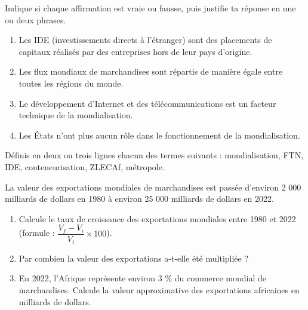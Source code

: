 \documentclass[11pt]{article}
\newcommand{\cle}[1]{{\popxbold\color{popdark}#1}}
\newcounter{popsec}
\newcounter{popsub}
\newcommand{\courssub}[1]{%
  \stepcounter{popsub}%
  \par\vspace{9pt}\noindent{\popxbold\fontsize{11.5}{13}\selectfont\color{popink}{\color{poporange}\thepopsec.\thepopsub}\hspace{6pt}#1}\par\nopagebreak\vspace{4pt}
}
\begin{document}
\begin{exercice}
Indique si chaque affirmation est vraie ou fausse, puis justifie ta réponse en une ou deux phrases.
\begin{enumerate}
\item Les IDE (investissements directs à l'étranger) sont des placements de capitaux réalisés par des entreprises hors de leur pays d'origine.
\item Les flux mondiaux de marchandises sont répartis de manière égale entre toutes les régions du monde.
\item Le développement d'Internet et des télécommunications est un facteur technique de la mondialisation.
\item Les États n'ont plus aucun rôle dans le fonctionnement de la mondialisation.
\end{enumerate}
\end{exercice}

\begin{exercice}[Définitions]
Définis en deux ou trois lignes chacun des termes suivants : \cle{mondialisation}, \cle{FTN}, \cle{IDE}, \cle{conteneurisation}, \cle{ZLECAf}, \cle{métropole}.
\end{exercice}

\begin{exercice}
La valeur des exportations mondiales de marchandises est passée d'environ 2 000 milliards de dollars en 1980 à environ 25 000 milliards de dollars en 2022.
\begin{enumerate}
\item Calcule le taux de croissance des exportations mondiales entre 1980 et 2022 (formule : $\dfrac{V_f - V_i}{V_i} \times 100$).
\item Par combien la valeur des exportations a-t-elle été multipliée ?
\item En 2022, l'Afrique représente environ 3 \% du commerce mondial de marchandises. Calcule la valeur approximative des exportations africaines en milliards de dollars.
\end{enumerate}
\end{exercice}

\courssub{Je m'entraîne}
\end{document}
